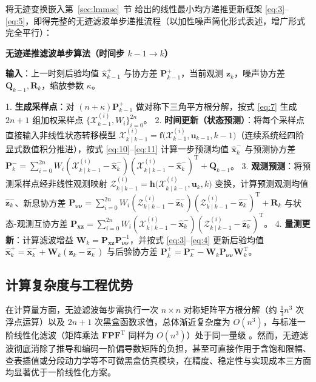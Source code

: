 将无迹变换嵌入第~\ref{sec:lmmse}~节 给出的线性最小均方递推更新框架 \eqref{eq:3}–\eqref{eq:5}，即得完整的无迹滤波单步递推流程（以加性噪声简化形式表述，增广形式完全平行）：

\begin{remark}\label{rem:ukf-alg}
\textbf{无迹递推滤波单步算法（时间步 $k - 1 \to k$）}

\textbf{输入}：上一时刻后验均值 $\hat{\bm{x}}_{k-1}^{+}$ 与协方差 $\bm{P}_{k-1}^{+}$，当前观测 $\bm{z}_k$，噪声协方差 $\bm{Q}_{k-1}, \bm{R}_k$，缩放参数 $\kappa$。

1. \textbf{生成采样点}：对 $(n + \kappa)\bm{P}_{k-1}^{+}$ 做对称下三角平方根分解，按式 \eqref{eq:7} 生成 $2n + 1$ 组加权采样点 $\{\mathcal{X}_{k-1}^{(i)}, W_i\}_{i=0}^{2n}$。
2. \textbf{时间更新（状态预测）}：将每个采样点直接输入非线性状态转移模型 $\mathcal{X}_{k\mid k-1}^{(i)} = \bm{f}\bigl(\mathcal{X}_{k-1}^{(i)}, \bm{u}_{k-1}, k-1\bigr)$（连续系统经四阶显式数值积分推进），按式 \eqref{eq:10}–\eqref{eq:11} 计算一步预测均值 $\hat{\bm{x}}_k^{-}$ 与预测协方差 $\bm{P}_k^{-} = \sum_{i=0}^{2n} W_i (\mathcal{X}_{k\mid k-1}^{(i)} - \hat{\bm{x}}_k^{-})(\mathcal{X}_{k\mid k-1}^{(i)} - \hat{\bm{x}}_k^{-})^{\mathrm{T}} + \bm{Q}_{k-1}$。
3. \textbf{观测预测}：将预测采样点经非线性观测映射 $\mathcal{Z}_{k\mid k-1}^{(i)} = \bm{h}\bigl(\mathcal{X}_{k\mid k-1}^{(i)}, \bm{u}_k, k\bigr)$ 变换，计算预测观测均值 $\hat{\bm{z}}_k^{-}$、新息协方差 $\bm{P}_{\bm{\nu}\bm{\nu}} = \sum_{i=0}^{2n} W_i (\mathcal{Z}_{k\mid k-1}^{(i)} - \hat{\bm{z}}_k^{-})(\mathcal{Z}_{k\mid k-1}^{(i)} - \hat{\bm{z}}_k^{-})^{\mathrm{T}} + \bm{R}_k$ 与状态-观测互协方差 $\bm{P}_{\bm{x}\bm{z}} = \sum_{i=0}^{2n} W_i (\mathcal{X}_{k\mid k-1}^{(i)} - \hat{\bm{x}}_k^{-})(\mathcal{Z}_{k\mid k-1}^{(i)} - \hat{\bm{z}}_k^{-})^{\mathrm{T}}$。
4. \textbf{量测更新}：计算滤波增益 $\bm{W}_k = \bm{P}_{\bm{x}\bm{z}} \bm{P}_{\bm{\nu}\bm{\nu}}^{-1}$，并按式 \eqref{eq:3}–\eqref{eq:4} 更新后验均值 $\hat{\bm{x}}_k^{+} = \hat{\bm{x}}_k^{-} + \bm{W}_k (\bm{z}_k - \hat{\bm{z}}_k^{-})$ 与后验协方差 $\bm{P}_k^{+} = \bm{P}_k^{-} - \bm{W}_k \bm{P}_{\bm{\nu}\bm{\nu}} \bm{W}_k^{\mathrm{T}}$。

\end{remark}

\subsection{计算复杂度与工程优势}\label{sec:complexity}

在计算量方面，无迹滤波每步需执行一次 $n \times n$ 对称矩阵平方根分解（约 $\frac{1}{3}n^3$ 次浮点运算）以及 $2n + 1$ 次黑盒函数求值，总体渐近复杂度为 $O(n^3)$，与标准一阶线性化滤波（矩阵乘法 $\bm{F}\bm{P}\bm{F}^{\mathrm{T}}$ 同样为 $O(n^3)$）处于同一量级 \cite{r08}。然而，无迹滤波彻底消除了推导和编码一阶偏导数矩阵的负担，甚至可直接作用于含饱和限幅、查表插值或分段动力学等不可微黑盒仿真模块，在精度、稳定性与实现成本三方面均显著优于一阶线性化方案。
